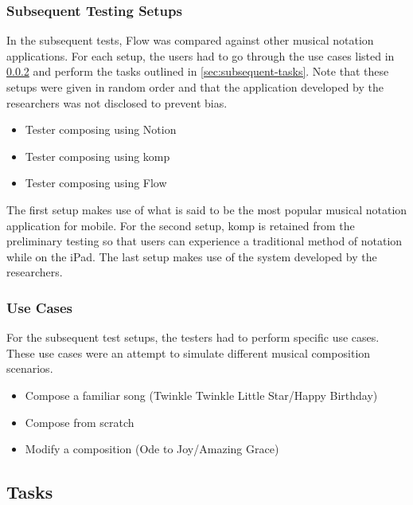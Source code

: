 			\subsubsection{Subsequent Testing Setups}

				In the subsequent tests, Flow was compared against other musical notation applications. For each setup, the users had to go through the use cases listed in \ref{sec:use-cases} and perform the tasks outlined in \ref{sec:subsequent-tasks}. Note that these setups were given in random order and that the application developed by the researchers was not disclosed to prevent bias.

				\begin{itemize}
					\item Tester composing using Notion
					\item Tester composing using komp
					\item Tester composing using Flow
				\end{itemize}

				The first setup makes use of what is said to be the most popular musical notation application for mobile. For the second setup, komp is retained from the preliminary testing so that users can experience a traditional method of notation while on the iPad. The last setup makes use of the system developed by the researchers.

			\subsubsection{Use Cases}
			\label{sec:use-cases}

				For the subsequent test setups, the testers had to perform specific use cases. These use cases were an attempt to simulate different musical composition scenarios. 

				\begin{itemize}
				    \item Compose a familiar song (Twinkle Twinkle Little Star/Happy Birthday)
				    \item Compose from scratch
				    \item Modify a composition (Ode to Joy/Amazing Grace)
				\end{itemize}

		\subsection{Tasks}
		\label{sec:tasks}

